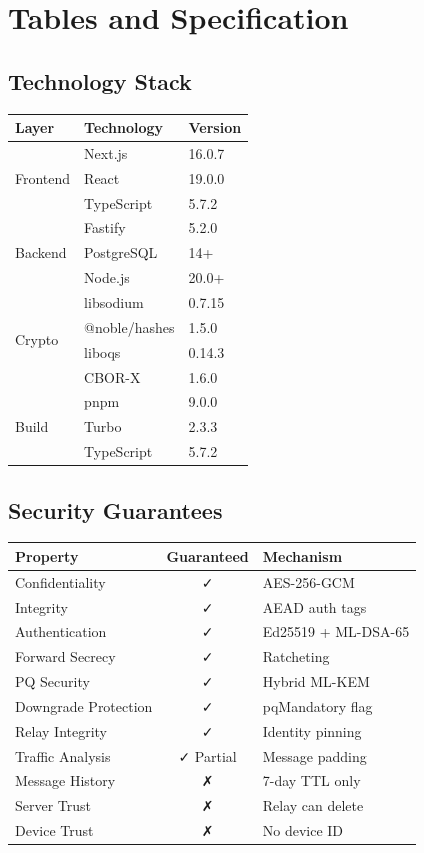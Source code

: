\documentclass[11pt,a4paper,oneside]{book}
\begin{document}
\vspace{-1cm}\part{Tables and Specification}
\vspace{-0.5cm}\chapter{Technology Stack}
\begin{table}[h]
\centering
\begin{tabular}{|l|l|l|}
\hline
\textbf{Layer} & \textbf{Technology} & \textbf{Version} \\
\hline
\multirow{3}{*}{Frontend} & Next.js & 16.0.7 \\
& React & 19.0.0 \\
& TypeScript & 5.7.2 \\
\hline
\multirow{3}{*}{Backend} & Fastify & 5.2.0 \\
& PostgreSQL & 14+ \\
& Node.js & 20.0+ \\
\hline
\multirow{4}{*}{Crypto} & libsodium & 0.7.15 \\
& @noble/hashes & 1.5.0 \\
& liboqs & 0.14.3 \\
& CBOR-X & 1.6.0 \\
\hline
\multirow{3}{*}{Build} & pnpm & 9.0.0 \\
& Turbo & 2.3.3 \\
& TypeScript & 5.7.2 \\
\hline
\end{tabular}
\end{table}
\vspace{-0.5cm}\chapter{Security Guarantees}
\begin{table}[h]
\centering
\begin{tabular}{|p{4cm}|c|p{5cm}|}
\hline
\textbf{Property} & \textbf{Guaranteed} & \textbf{Mechanism} \\
\hline
Confidentiality & ✓ & AES-256-GCM \\
\hline
Integrity & ✓ & AEAD auth tags \\
\hline
Authentication & ✓ & Ed25519 + ML-DSA-65 \\
\hline
Forward Secrecy & ✓ & Ratcheting \\
\hline
PQ Security & ✓ & Hybrid ML-KEM \\
\hline
Downgrade Protection & ✓ & pqMandatory flag \\
\hline
Relay Integrity & ✓ & Identity pinning \\
\hline
Traffic Analysis & ✓ Partial & Message padding \\
\hline
Message History & ✗ & 7-day TTL only \\
\hline
Server Trust & ✗ & Relay can delete \\
\hline
Device Trust & ✗ & No device ID \\
\hline
\end{tabular}
\end{table}
\end{document}
